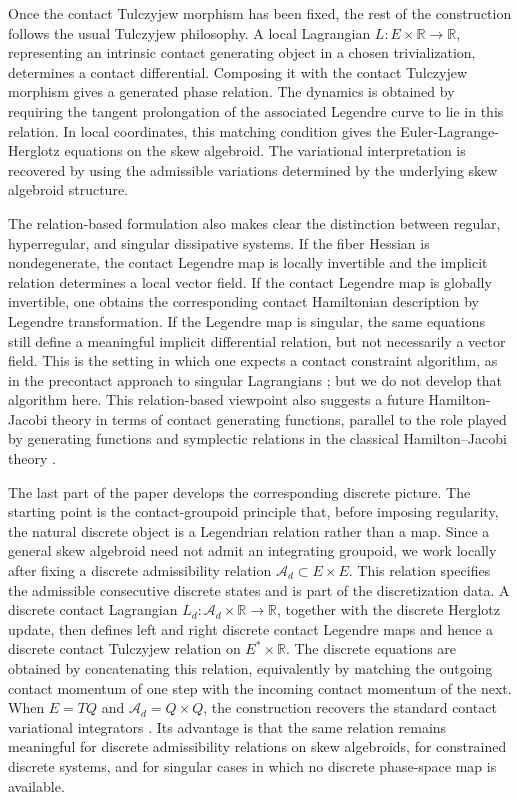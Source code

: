 \documentclass[11pt]{article}
\newcommand{\R}{\mathbb{R}}
\newcommand{\mc}[1]{\mathcal{#1}}
\begin{document}
Once the contact Tulczyjew morphism has been fixed, the rest of the construction
follows the usual Tulczyjew philosophy. A local Lagrangian
\(L:E\times \mathbb R\to\mathbb R\), representing an intrinsic contact generating
object in a chosen trivialization, determines a contact differential. Composing it
with the contact Tulczyjew morphism gives a generated phase relation. The dynamics
is obtained by requiring the tangent prolongation of the associated Legendre curve
to lie in this relation. In local coordinates, this matching condition gives the
Euler-Lagrange-Herglotz equations on the skew algebroid. The variational
interpretation is recovered by using the admissible variations determined by the
underlying skew algebroid structure.

The relation-based formulation also makes clear the distinction between regular,
hyperregular, and singular dissipative systems. If the fiber Hessian is
nondegenerate, the contact Legendre map is locally invertible and the implicit
relation determines a local vector field. If the contact Legendre map is globally
invertible, one obtains the corresponding contact Hamiltonian description by
Legendre transformation. If the Legendre map is singular, the same equations still
define a meaningful implicit differential relation, but not necessarily a vector
field. This is the setting in which one expects a contact constraint algorithm,
as in the precontact approach to singular Lagrangians
\cite{deLeonLainz2019}; but we do not develop that algorithm here. This relation-based viewpoint also suggests a future Hamilton-Jacobi theory
in terms of contact generating functions, parallel to the role played by
generating functions and symplectic relations in the classical Hamilton--Jacobi theory \cite{AbrahamMarsden1978, FerraroDeLeonMarreroMartinVaquero2017}.



The last part of the paper develops the corresponding discrete picture. The
starting point is the contact-groupoid principle that, before imposing
regularity, the natural discrete object is a Legendrian relation rather than a
map. Since a general skew algebroid need not admit an integrating groupoid, we
work locally after fixing a discrete admissibility relation
\(\mc A_d\subset E\times E\). This relation specifies the admissible consecutive
discrete states and is part of the discretization data. A discrete contact
Lagrangian \(L_d:\mc A_d\times\R\to\R\), together with the discrete Herglotz
update, then defines left and right discrete contact Legendre maps and hence a
discrete contact Tulczyjew relation on \(E^*\times\R\). The discrete equations
are obtained by concatenating this relation, equivalently by matching the
outgoing contact momentum of one step with the incoming contact momentum of the
next. When \(E=TQ\) and \(\mc A_d=Q\times Q\), the construction recovers the
standard contact variational integrators \cite{SimoesMartinDeDiegoLainzDeLeon2021}. Its advantage is that the same
relation remains meaningful for discrete admissibility relations on skew
algebroids, for constrained discrete systems, and for singular cases in which no
discrete phase-space map is available.
\end{document}
